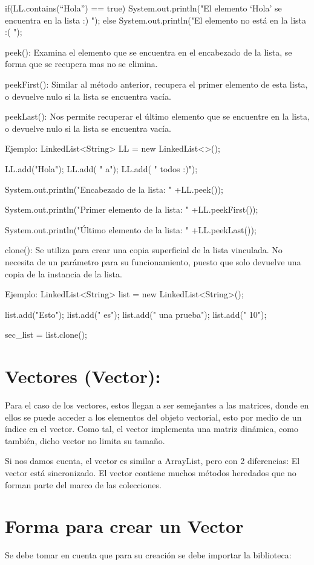 \documentclass[12pt, letterpaper]{article} %
\begin{document}
if(LL.contains(“Hola”) == true){
System.out.println("El elemento ‘Hola’ se encuentra en la lista :) ");
}
else{
	System.out.println("El elemento no está en la lista :( ");
}


peek():
Examina el elemento que se encuentra en el encabezado de la lista, se forma que se recupera mas no se elimina.

peekFirst():
Similar al método anterior, recupera el primer elemento de esta lista, o devuelve nulo si la lista se encuentra vacía.

peekLast():
Nos permite recuperar el último elemento que se encuentre en la lista, o devuelve nulo si la lista se encuentra vacía.

Ejemplo:
LinkedList<String> LL = new LinkedList<>();

LL.add("Hola");  
LL.add( " a");
LL.add( " todos :)");

System.out.println("Encabezado de la lista: " +LL.peek());

System.out.println("Primer elemento de la lista: " +LL.peekFirst());

System.out.println("Último elemento de la lista: " +LL.peekLast());


clone():
Se utiliza para crear una copia superficial de la lista vinculada. No necesita de un parámetro para su funcionamiento, puesto que solo devuelve una copia de la instancia de la lista.

Ejemplo:
LinkedList<String> list = new LinkedList<String>();

list.add("Esto");
list.add(" es");
list.add(" una prueba");
list.add(" 10");


sec_list = list.clone();


\section*{Vectores (Vector):}
Para el caso de los vectores, estos llegan a ser semejantes a las matrices, donde en ellos se puede acceder a los elementos del objeto vectorial, esto por medio de un índice en el vector. Como tal, el vector implementa una matriz dinámica, como también, dicho vector no limita su tamaño.

Si nos damos cuenta, el vector es similar a ArrayList, pero con 2 diferencias:
El vector está sincronizado.
El vector contiene muchos métodos heredados que no forman parte del marco de las colecciones.

\section*{Forma para crear un Vector}
Se debe tomar en cuenta que para su creación se debe importar la biblioteca:
\end{document}
